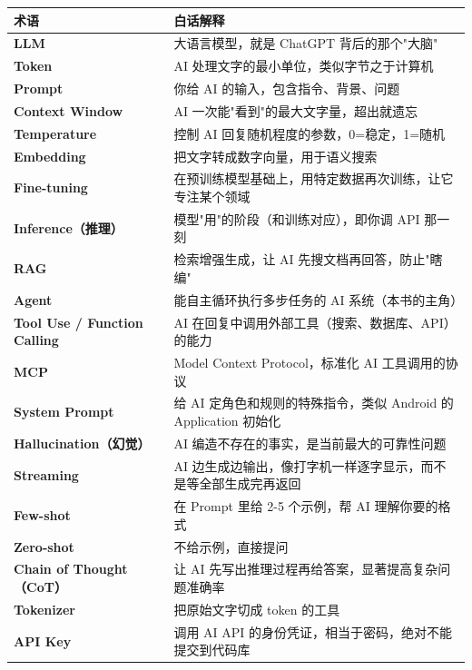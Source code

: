 \begingroup
\scriptsize
\setlength{\tabcolsep}{3pt}
\begin{longtable}{|p{}|p{}|}
\hline
术语 & 白话解释 \\ \hline
\textbf{LLM} & 大语言模型，就是 ChatGPT 背后的那个"大脑" \\ \hline
\textbf{Token} & AI 处理文字的最小单位，类似字节之于计算机 \\ \hline
\textbf{Prompt} & 你给 AI 的输入，包含指令、背景、问题 \\ \hline
\textbf{Context Window} & AI 一次能"看到"的最大文字量，超出就遗忘 \\ \hline
\textbf{Temperature} & 控制 AI 回复随机程度的参数，0=稳定，1=随机 \\ \hline
\textbf{Embedding} & 把文字转成数字向量，用于语义搜索 \\ \hline
\textbf{Fine-tuning} & 在预训练模型基础上，用特定数据再次训练，让它专注某个领域 \\ \hline
\textbf{Inference（推理）} & 模型"用"的阶段（和训练对应），即你调 API 那一刻 \\ \hline
\textbf{RAG} & 检索增强生成，让 AI 先搜文档再回答，防止"瞎编" \\ \hline
\textbf{Agent} & 能自主循环执行多步任务的 AI 系统（本书的主角） \\ \hline
\textbf{Tool Use / Function Calling} & AI 在回复中调用外部工具（搜索、数据库、API）的能力 \\ \hline
\textbf{MCP} & Model Context Protocol，标准化 AI 工具调用的协议 \\ \hline
\textbf{System Prompt} & 给 AI 定角色和规则的特殊指令，类似 Android 的 Application 初始化 \\ \hline
\textbf{Hallucination（幻觉）} & AI 编造不存在的事实，是当前最大的可靠性问题 \\ \hline
\textbf{Streaming} & AI 边生成边输出，像打字机一样逐字显示，而不是等全部生成完再返回 \\ \hline
\textbf{Few-shot} & 在 Prompt 里给 2-5 个示例，帮 AI 理解你要的格式 \\ \hline
\textbf{Zero-shot} & 不给示例，直接提问 \\ \hline
\textbf{Chain of Thought（CoT）} & 让 AI 先写出推理过程再给答案，显著提高复杂问题准确率 \\ \hline
\textbf{Tokenizer} & 把原始文字切成 token 的工具 \\ \hline
\textbf{API Key} & 调用 AI API 的身份凭证，相当于密码，绝对不能提交到代码库 \\ \hline
\end{longtable}
\endgroup

